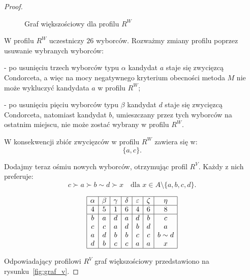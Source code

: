 \documentclass[12pt,a4paper]{mwrep}
\begin{document}
\begin{proof}
\begin{figure}[H]
			
			\caption{Graf większościowy dla profilu \(R^W\)}
			\label{fig:graf_u}
			
		\end{figure}
		
		W profilu \(R^W\) uczestniczy \(26\) wyborców. Rozważmy zmiany profilu poprzez usuwanie wybranych wyborców:
		
		- po usunięciu trzech wyborców typu \(\alpha\) kandydat \(a\) staje się zwycięzcą Condorceta,
		a więc na mocy negatywnego kryterium obecności metoda \(M\) nie może wykluczyć kandydata \(a\) w profilu \(R^W\);
		
		- po usunięciu pięciu wyborców typu \(\beta\) kandydat \(d\) staje się zwycięzcą Condorceta, natomiast kandydat \(b\), umieszczany przez tych wyborców na ostatnim miejscu, nie może zostać wybrany w profilu \(R^W\).
		
		W konsekwencji zbiór zwycięzców w profilu \(R^W\) zawiera się w:
		\[
		\{a,c\}.
		\]
		
		Dodajmy teraz ośmiu nowych wyborców, otrzymując profil \(R^V\). Każdy z nich preferuje:
		\[
		c \succ a \succ b \sim d  \succ x \quad \text{dla } x \in A \setminus \{a,b,c,d\}.
		\]
		
		\begin{table}[H]
			\centering
			\[
			\begin{array}{|c|c|c|c|c|c|c|}
				\hline
				\alpha & \beta & \gamma & \delta & \varepsilon & \zeta & \eta \\
				\hline
				4 & 5 & 1 & 6 & 4 & 6 & 8 \\
				\hline
				b & a & d & a & d & b & c \\
				c & c & a & d & b & d & a \\
				a & d & b & b & c & c & b\sim d \\
				d & b & c & c & a & a & x \\
				\hline
			\end{array}
			\]
			\caption{Profil preferencji \(R^V\)}
			\label{tab:profil_v_typy}
		\end{table}
		
		Odpowiadający profilowi \(R^V\) graf większościowy przedstawiono na rysunku~\ref{fig:graf_v}.
		

\end{proof}
\end{document}
